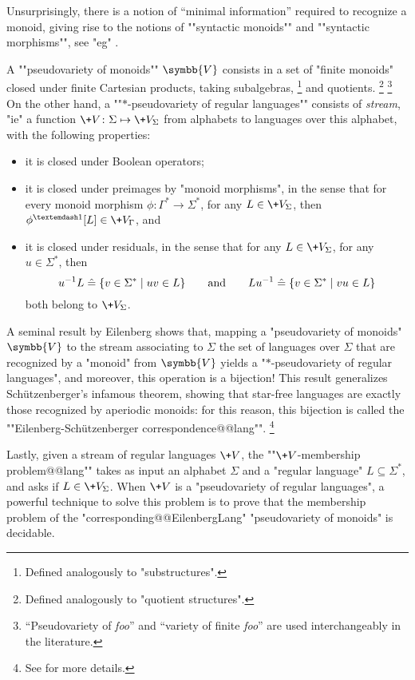 Unsurprisingly, there is a notion of ``minimal information'' required to recognize a monoid,
giving rise to the notions of ""syntactic monoids"" and ""syntactic morphisms"",
see "eg" \cite[Theorem~1.7]{Bojanczyk2020MSO}.

A \AP""pseudovariety of monoids"" $\symbb{V}$%
consists in a set of "finite monoids" closed under finite Cartesian products,
taking subalgebras,%
\footnote{Defined analogously to "substructures".}
and quotients.%
\footnote{Defined analogously to "quotient structures".}%
\footnote{``Pseudovariety of \emph{foo}'' and ``variety of finite \emph{foo}''
are used interchangeably in the literature.}
On the other hand, a ""$\ast$-pseudovariety of regular languages""
consists of \emph{stream}, "ie" a function $\+V\colon \Sigma \mapsto \+V_{\Sigma}$ from alphabets to languages over this alphabet, with the following properties:
\begin{itemize}
	\item it is closed under Boolean operators;
	\item it is closed under preimages by "monoid morphisms", in the sense that
		for every monoid morphism $\phi\colon \Gamma^* \to \Sigma^*$, for any $L \in \+V_{\Sigma}$,
		then $\phi^{—1}[L] \in \+V_{\Gamma}$, and
	\item it is closed under residuals, in the sense that for any $L \in \+V_{\Sigma}$,
		for any $u\in\Sigma^*$, then
		\[
			u^{-1}L \mathrel{\hat{=}} \{v \in \Sigma^* \mid uv \in L\}
			\qquad\text{and}\qquad
			Lu^{-1} \mathrel{\hat{=}} \{v \in \Sigma^* \mid vu \in L\}
		\]
		both belong to $\+V_{\Sigma}$.
\end{itemize}
A seminal result by Eilenberg shows that, mapping a "pseudovariety of monoids" $\symbb{V}$
to the stream associating to $\Sigma$ the set of languages over $\Sigma$ that are recognized
by a "monoid" from $\symbb{V}$ yields a "$*$-pseudovariety of regular languages",
and moreover, this operation is a bijection!
This result generalizes Schützenberger's infamous theorem, showing that
star-free languages are exactly those recognized by aperiodic monoids:
for this reason, this bijection is called the \AP""Eilenberg-Schützenberger correspondence@@lang"".%
\footnote{See \cite[Theorem XIII.4.10, p.~228]{Pin2022MathematicalFoundations} for more details.}

Lastly, given a stream of regular languages $\+V$, the \AP""$\+V$-membership problem@@lang""
takes as input an alphabet $\Sigma$ and a "regular language" $L \subseteq \Sigma^*$,
and asks if $L \in \+V_{\Sigma}$. When $\+V$ is a "pseudovariety of regular languages",
a powerful technique to solve this problem is to prove that the membership problem
of the "corresponding@@EilenbergLang" "pseudovariety of monoids" is decidable.

